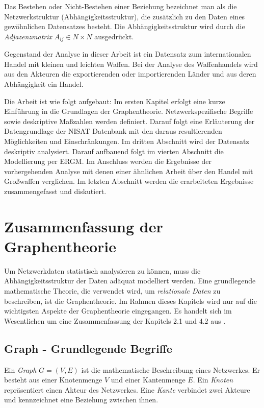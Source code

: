 \documentclass[a4paper,ngerman,oneside,titlepage,bibliography=totoc,11pt]{scrreprt}
\begin{document}
Das Bestehen oder Nicht-Bestehen einer Beziehung bezeichnet man als die Netzwerkstruktur (Abhängigkeitsstruktur), die zusätzlich zu den Daten eines gewöhnlichen Datensatzes besteht. Die Abhängigkeitsstruktur wird durch die \emph{Adjazenzmatrix} $A_{ij} \in N \times N$ ausgedrückt.

Gegenstand der Analyse in dieser Arbeit ist ein Datensatz zum internationalen Handel mit kleinen und leichten Waffen. 
Bei der Analyse des Waffenhandels wird aus den Akteuren die exportierenden oder importierenden Länder und aus deren Abhängigkeit ein Handel.

Die Arbeit ist wie folgt aufgebaut: Im ersten Kapitel erfolgt eine kurze Einführung in die Grundlagen der Graphentheorie. Netzwerkspezifische Begriffe sowie deskriptive Maßzahlen werden definiert. Darauf folgt eine Erläuterung der Datengrundlage der NISAT Datenbank mit den daraus resultierenden Möglichkeiten und Einschränkungen. Im dritten Abschnitt wird der Datensatz deskriptiv analysiert. Darauf aufbauend folgt im vierten Abschnitt die Modellierung per ERGM. Im Anschluss werden die Ergebnisse der vorhergehenden Analyse mit denen einer ähnlichen Arbeit über den Handel mit Großwaffen verglichen. Im letzten Abschnitt werden die erarbeiteten Ergebnisse zusammengefasst und diskutiert.





\chapter{Zusammenfassung der Graphentheorie}

Um Netzwerkdaten statistisch analysieren zu können, muss die Abhängigkeitsstruktur der Daten adäquat modelliert werden. Eine grundlegende mathematische Theorie, die verwendet wird, um \emph{relationale Daten} zu beschreiben, ist die Graphentheorie. Im Rahmen dieses Kapitels wird nur auf die wichtigsten Aspekte der Graphentheorie eingegangen. Es handelt sich im Wesentlichen um eine Zusammenfassung der Kapitels 2.1 und 4.2 aus \citet{kol09}.

\section{Graph - Grundlegende Begriffe}

Ein \emph{Graph} $G = (V,E)$ ist die mathematische Beschreibung eines Netzwerkes. Er besteht aus einer Knotenmenge $V$ und einer Kantenmenge $E$. Ein \emph{Knoten} repräsentiert einen Akteur des Netzwerkes. Eine \emph{Kante} verbindet zwei Akteure und kennzeichnet eine Beziehung zwischen ihnen.
\end{document}
